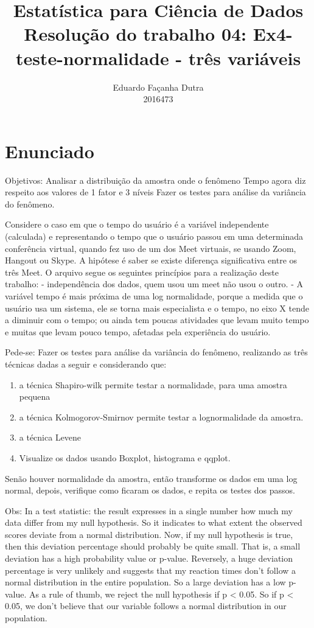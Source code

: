 \documentclass[
]{article}
\title{Estatística para Ciência de Dados\\
Resolução do trabalho 04: Ex4-teste-normalidade - três variáveis}
\author{Eduardo Façanha Dutra\\
2016473}
\date{}
\providecommand{\tightlist}{%
  \setlength{\itemsep}{0pt}\setlength{\parskip}{0pt}}
\begin{document}
\maketitle

{
\setcounter{tocdepth}{2}
\tableofcontents
}
\hypertarget{enunciado}{%
\section{Enunciado}\label{enunciado}}

Objetivos: Analisar a distribuição da amostra onde o fenômeno Tempo
agora diz respeito aos valores de 1 fator e 3 níveis Fazer os testes
para análise da variância do fenômeno.

Considere o caso em que o tempo do usuário é a variável independente
(calculada) e representando o tempo que o usuário passou em uma
determinada conferência virtual, quando fez uso de um dos Meet virtuais,
se usando Zoom, Hangout ou Skype. A hipótese é saber se existe diferença
significativa entre os três Meet. O arquivo segue os seguintes
princípios para a realização deste trabalho: - independência dos dados,
quem usou um meet não usou o outro. - A variável tempo é mais próxima de
uma log normalidade, porque a medida que o usuário usa um sistema, ele
se torna mais especialista e o tempo, no eixo X tende a diminuir com o
tempo; ou ainda tem poucas atividades que levam muito tempo e muitas que
levam pouco tempo, afetadas pela experiência do usuário.

Pede-se: Fazer os testes para análise da variância do fenômeno,
realizando as três técnicas dadas a seguir e considerando que:

\begin{enumerate}
\def\labelenumi{\arabic{enumi}.}
\tightlist
\item
  a técnica Shapiro-wilk permite testar a normalidade, para uma amostra
  pequena
\item
  a técnica Kolmogorov-Smirnov permite testar a lognormalidade da
  amostra.
\item
  a técnica Levene
\item
  Visualize os dados usando Boxplot, histograma e qqplot.
\end{enumerate}

Senão houver normalidade da amostra, então transforme os dados em uma
log normal, depois, verifique como ficaram os dados, e repita os testes
dos passos.

Obs: In a test statistic: the result expresses in a single number how
much my data differ from my null hypothesis. So it indicates to what
extent the observed scores deviate from a normal distribution. Now, if
my null hypothesis is true, then this deviation percentage should
probably be quite small. That is, a small deviation has a high
probability value or p-value. Reversely, a huge deviation percentage is
very unlikely and suggests that my reaction times don't follow a normal
distribution in the entire population. So a large deviation has a low
p-value. As a rule of thumb, we reject the null hypothesis if p
\textless{} 0.05. So if p \textless{} 0.05, we don't believe that our
variable follows a normal distribution in our population.
\end{document}
